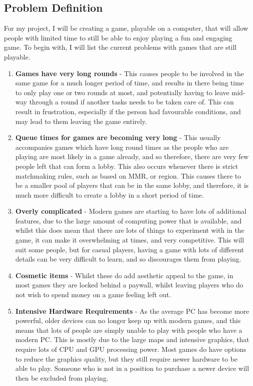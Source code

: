 \subsection{Problem Definition}

For my project, I will be creating a game, playable on a computer, that will allow people with limited time to still be able to enjoy playing a fun and engaging game. To begin with, I will list the current problems with games that are still playable.

\begin{enumerate}[label=\textbf{\arabic*.}]
    \item \textbf{Games have very long rounds} - This causes people to be involved in the same game for a much longer period of time, and results in there being time to only play one or two rounds at most, and potentially having to leave mid-way through a round if another tasks needs to be taken care of. This can result in frustration, especially if the person had favourable conditions, and may lead to them leaving the game entirely. 
    \item \textbf{Queue times for games are becoming very long} - This usually accompanies games which have long round times as the people who are playing are most likely in a game already, and so therefore, there are very few people left that can form a lobby. This also occurs whenever there is strict matchmaking rules, such as based on MMR, or region. This causes there to be a smaller pool of players that can be in the same lobby, and therefore, it is much more difficult to create a lobby in a short period of time.
    \item \textbf{Overly complicated} - Modern games are starting to have lots of additional features, due to the large amount of computing power that is available, and whilst this does mean that there are lots of things to experiment with in the game, it can make it overwhelming at times, and very competitive. This will suit some people, but for casual players, having a game with lots of different details can be very difficult to learn, and so discourages them from playing.
    \item \textbf{Cosmetic items} - Whilst these do add aesthetic appeal to the game, in most games they are locked behind a paywall, whilst leaving players who do not wish to spend money on a game feeling left out.
    \item \textbf{Intensive Hardware Requirements} - As the average PC has become more powerful, older devices can no longer keep up with modern games, and this means that lots of people are simply unable to play with people who have a modern PC. This is mostly due to the large maps and intensive graphics, that require lots of CPU and GPU processing power. Most games do have options to reduce the graphics quality, but they still require newer hardware to be able to play. Someone who is not in a position to purchase a newer device will then be excluded from playing.

\end{enumerate}
